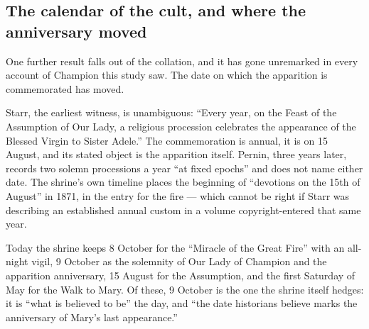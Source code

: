\subsection{The calendar of the cult, and where the anniversary moved}

One further result falls out of the collation, and it has gone
unremarked in every account of Champion this study saw. The date on
which the apparition is commemorated has moved.

Starr, the earliest witness, is unambiguous: ``Every year, on the Feast
of the Assumption of Our Lady, a religious procession celebrates the
appearance of the Blessed Virgin to Sister Adele.'' The commemoration
is annual, it is on 15 August, and its stated object is the apparition
itself. Pernin, three years later, records two solemn processions a
year ``at fixed epochs'' and does not name either date. The shrine's
own timeline places the beginning of ``devotions on the 15th of
August'' in 1871, in the entry for the fire --- which cannot be right
if Starr was describing an established annual custom in a volume
copyright-entered that same year.

Today the shrine keeps 8 October for the ``Miracle of the Great Fire''
with an all-night vigil, 9 October as the solemnity of Our Lady of
Champion and the apparition anniversary, 15 August for the Assumption,
and the first Saturday of May for the Walk to Mary. Of these, 9 October
is the one the shrine itself hedges: it is ``what is believed to be''
the day, and ``the date historians believe marks the anniversary of
Mary's last appearance.''

